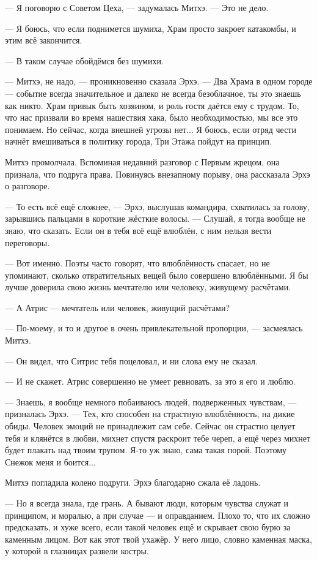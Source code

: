 --- Я поговорю с Советом Цеха, --- задумалась Митхэ.
--- Это не дело.

--- Я боюсь, что если поднимется шумиха, Храм просто закроет катакомбы, и этим всё закончится.

--- В таком случае обойдёмся без шумихи.

--- Митхэ, не надо, --- проникновенно сказала Эрхэ.
--- Два Храма в одном городе --- событие всегда значительное и далеко не всегда безоблачное, ты это знаешь как никто.
Храм привык быть хозяином, и роль гостя даётся ему с трудом.
То, что нас призвали во время нашествия хака, было необходимостью, мы все это понимаем.
Но сейчас, когда внешней угрозы нет...
Я боюсь, если отряд чести начнёт вмешиваться в политику города, Три Этажа пойдут на принцип.

Митхэ промолчала.
Вспоминая недавний разговор с Первым жрецом, она признала, что подруга права.
Повинуясь внезапному порыву, она рассказала Эрхэ о разговоре.

--- То есть всё ещё сложнее, --- Эрхэ, выслушав командира, схватилась за голову, зарывшись пальцами в короткие жёсткие волосы.
--- Слушай, я тогда вообще не знаю, что сказать.
Если он в тебя всё ещё влюблён, с ним нельзя вести переговоры.

--- Вот именно.
Поэты часто говорят, что влюблённость спасает, но не упоминают, сколько отвратительных вещей было совершено влюблёнными.
Я бы лучше доверила свою жизнь мечтателю или человеку, живущему расчётами.

--- А Атрис --- мечтатель или человек, живущий расчётами?

--- По-моему, и то и другое в очень привлекательной пропорции, --- засмеялась Митхэ.

--- Он видел, что Ситрис тебя поцеловал, и ни слова ему не сказал.

--- И не скажет.
Атрис совершенно не умеет ревновать, за это я его и люблю.

--- Знаешь, я вообще немного побаиваюсь людей, подверженных чувствам, --- призналась Эрхэ.
--- Тех, кто способен на страстную влюблённость, на дикие обиды.
Человек эмоций не принадлежит сам себе.
Сейчас он страстно целует тебя и клянётся в любви, михнет спустя раскроит тебе череп, а ещё через михнет будет плакать над твоим трупом.
Я-то уж знаю, сама такая порой.
Поэтому Снежок меня и боится...

Митхэ погладила колено подруги.
Эрхэ благодарно сжала её ладонь.

--- Но я всегда знала, где грань.
А бывают люди, которым чувства служат и принципом, и моралью, а при случае --- и оправданием.
Плохо то, что их сложно предсказать, и хуже всего, если такой человек ещё и скрывает свою бурю за каменным лицом.
Вот как этот твой ухажёр.
У него лицо, словно каменная маска, у которой в глазницах развели костры.

